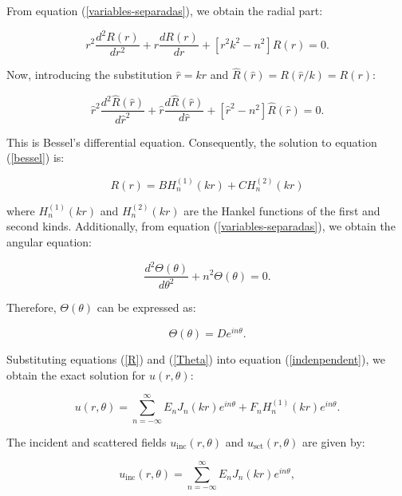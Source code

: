 \documentclass[11pt,twoside]{article}
\begin{document}
 From equation (\ref{variables-separadas}), we obtain the radial part:

\begin{equation*} 
r^2  \frac{d^2R(r)}{dr^2} + r \frac{dR(r)}{dr} + \left[ r^2k^2  - n^2 \right] R(r) = 0 .
\end{equation*}

 Now, introducing the substitution $\hat{r}=kr$ and $\hat{R}(\hat{r}) = R(\hat{r}/k) = R (r) $:

\begin{equation}\label{bessel} 
 \hat{r}^2  \frac{d^2\hat{R}(\hat{r})}{d\hat{r}^2} + \hat{r} \frac{d\hat{R}(\hat{r})}{d\hat{r}} + \left[ \hat{r}^2 - n^2 \right] \hat{R}(\hat{r}) = 0 .
\end{equation}

 This is Bessel's differential equation. Consequently, the solution to equation (\ref{bessel}) is:

\begin{equation}\label{R}
R(r) = B H_n^{(1)}(kr) + C H_n^{(2)}(kr)
\end{equation}

\noindent where \( H_n^{(1)}(kr) \) and \( H_n^{(2)}(kr) \) are the Hankel functions of the first and second kinds. Additionally, from equation (\ref{variables-separadas}), we obtain the angular equation:

\begin{equation*}\label{theta_dif}
\frac{d^2 \Theta(\theta)}{d \theta^2} + n^2 \Theta(\theta) = 0 . 
\end{equation*}

 Therefore, $\Theta(\theta)$ can be expressed as:

\begin{equation}\label{Theta}
\Theta(\theta) = D e^{in\theta} .
\end{equation}
 

 Substituting equations (\ref{R}) and (\ref{Theta}) into equation (\ref{indenpendent}), we obtain the exact solution for \( u(r, \theta) \):

\begin{equation*} 
u(r, \theta) = \sum_{n=-\infty}^{\infty} E_n J_{n}(kr)e^{in\theta} + F_n H_n^{(1)}(kr) e^{in\theta} .
\end{equation*}

 The incident and scattered fields \( u_{\text{inc}}(r, \theta) \) and \( u_{\text{sct}}(r, \theta) \) are given by:

\begin{equation}\label{analytic-inc} 
u_{\text{inc}}(r, \theta) = \sum_{n=-\infty}^{\infty} E_n J_{n}(kr) e^{in\theta},
\end{equation}
\end{document}
